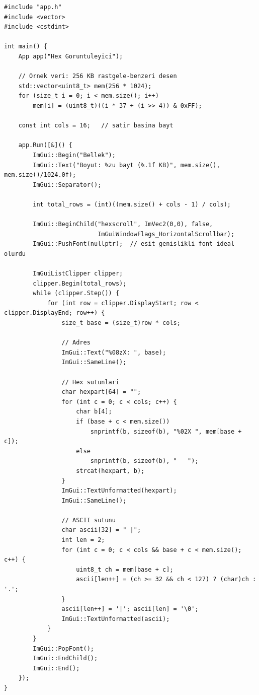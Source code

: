 \documentclass[11pt,a4paper]{article}
\begin{document}
\begin{lstlisting}
#include "app.h"
#include <vector>
#include <cstdint>

int main() {
    App app("Hex Goruntuleyici");

    // Ornek veri: 256 KB rastgele-benzeri desen
    std::vector<uint8_t> mem(256 * 1024);
    for (size_t i = 0; i < mem.size(); i++)
        mem[i] = (uint8_t)((i * 37 + (i >> 4)) & 0xFF);

    const int cols = 16;   // satir basina bayt

    app.Run([&]() {
        ImGui::Begin("Bellek");
        ImGui::Text("Boyut: %zu bayt (%.1f KB)", mem.size(), mem.size()/1024.0f);
        ImGui::Separator();

        int total_rows = (int)((mem.size() + cols - 1) / cols);

        ImGui::BeginChild("hexscroll", ImVec2(0,0), false,
                          ImGuiWindowFlags_HorizontalScrollbar);
        ImGui::PushFont(nullptr);  // esit genislikli font ideal olurdu

        ImGuiListClipper clipper;
        clipper.Begin(total_rows);
        while (clipper.Step()) {
            for (int row = clipper.DisplayStart; row < clipper.DisplayEnd; row++) {
                size_t base = (size_t)row * cols;

                // Adres
                ImGui::Text("%08zX: ", base);
                ImGui::SameLine();

                // Hex sutunlari
                char hexpart[64] = "";
                for (int c = 0; c < cols; c++) {
                    char b[4];
                    if (base + c < mem.size())
                        snprintf(b, sizeof(b), "%02X ", mem[base + c]);
                    else
                        snprintf(b, sizeof(b), "   ");
                    strcat(hexpart, b);
                }
                ImGui::TextUnformatted(hexpart);
                ImGui::SameLine();

                // ASCII sutunu
                char ascii[32] = " |";
                int len = 2;
                for (int c = 0; c < cols && base + c < mem.size(); c++) {
                    uint8_t ch = mem[base + c];
                    ascii[len++] = (ch >= 32 && ch < 127) ? (char)ch : '.';
                }
                ascii[len++] = '|'; ascii[len] = '\0';
                ImGui::TextUnformatted(ascii);
            }
        }
        ImGui::PopFont();
        ImGui::EndChild();
        ImGui::End();
    });
}
\end{lstlisting}
\end{document}
